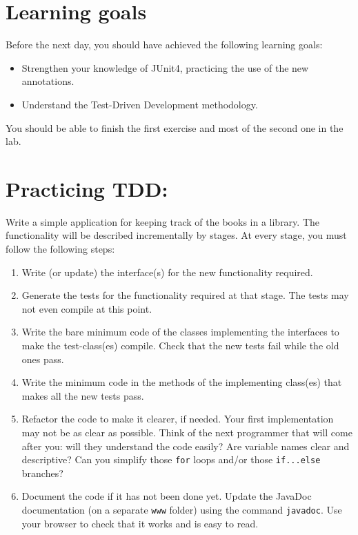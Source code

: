 \documentclass{article}
\begin{document}
\section*{Learning goals}
\label{sec:learning-goals}

Before the next day, you should have achieved the following learning
goals: 

\begin{itemize}
\item Strengthen your knowledge of JUnit4, practicing the use of the
  new annotations.
\item Understand the Test-Driven Development methodology. 
\end{itemize}

You should be able to finish the first exercise and most of the second
one in the lab.

\section{Practicing TDD: }
\label{sec:jj}

Write a simple application for keeping track of the books in a
library. The functionality will be described incrementally by
stages. At every stage, you must follow the following steps:

\begin{enumerate}
\item Write (or update) the interface(s) for the new functionality
  required. 
\item Generate the tests for the functionality required at that
  stage. The tests may not even compile at this point.
\item Write the bare minimum code of the classes implementing the
  interfaces to make the test-class(es) compile. 
  Check that the new tests fail while the old ones pass. 
\item Write the minimum code in the methods of the implementing
  class(es) that makes all the new tests pass.  
\item Refactor the code to make it clearer, if needed. Your first
  implementation may not be as clear as possible. Think of the next
  programmer that will come after you: will they understand the code
  easily? Are variable names clear and descriptive? Can you simplify
  those \verb+for+ loops and/or those \verb+if...else+ branches?
\item Document the
  code if it has not been done yet. Update the JavaDoc documentation
  (on a separate \verb+www+ folder) using the command
  \verb+javadoc+. Use your browser to check that it works and is easy
  to read. 
\end{enumerate}
\end{document}
